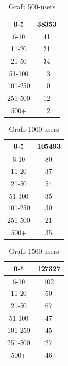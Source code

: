     \begin{table}[h!]
    \centering
    \begin{tabular}{ |c|c| }
     \hline
     0-5 & 38353 \\
     \hline
     6-10 & 41 \\
     \hline
     11-20 & 21 \\
     \hline
     21-50 & 34 \\
     \hline
     51-100 & 13 \\
     \hline
     101-250 & 10 \\
     \hline
     251-500 & 12 \\
     \hline
     500+ & 12 \\
     \hline
    \end{tabular}
    \caption{Grafo 500-users}
    \end{table}
    \begin{table}[h!]
    \centering
    \begin{tabular}{ |c|c| }
     \hline
     0-5 & 105493 \\
     \hline
     6-10 & 80 \\
     \hline
     11-20 & 37 \\
     \hline
     21-50 & 54 \\
     \hline
     51-100 & 35 \\
     \hline
     101-250 & 30 \\
     \hline
     251-500 & 21 \\
     \hline
     500+ & 35 \\
     \hline
    \end{tabular}
    \caption{Grafo 1000-users}
    \end{table}
    \begin{table}[h!]
    \centering
    \begin{tabular}{ |c|c| }
     \hline
     0-5 & 127327 \\
     \hline
     6-10 & 102 \\
     \hline
     11-20 & 50 \\
     \hline
     21-50 & 67 \\
     \hline
     51-100 & 47 \\
     \hline
     101-250 & 45 \\
     \hline
     251-500 & 27 \\
     \hline
     500+ & 46 \\
     \hline
    \end{tabular}
    \caption{Grafo 1500-users}
    \end{table}
